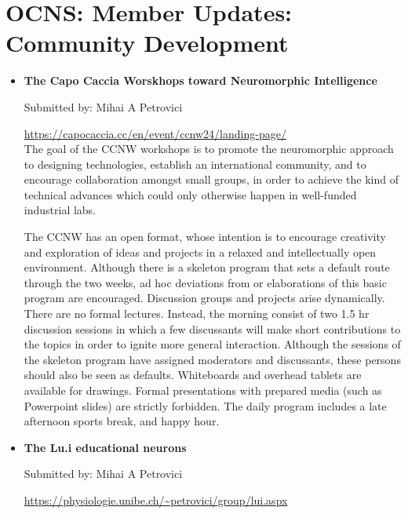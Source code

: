 \section*{OCNS: Member Updates: Community Development}%

\begin{itemize}[itemsep=3ex]
    \item \textbf{\large The Capo Caccia Worskhops toward Neuromorphic Intelligence}

        Submitted by: Mihai A Petrovici

        \url{https://capocaccia.cc/en/event/ccnw24/landing-page/}\\

        The goal of the CCNW workshops is to promote the neuromorphic approach to designing technologies, establish an international community, and to encourage collaboration amongst small groups, in order to achieve the kind of technical advances which could only otherwise happen in well-funded industrial labs.

        The CCNW has an open format, whose intention is to encourage creativity and exploration of ideas and projects in a relaxed and intellectually open environment. Although there is a skeleton program that sets a default route through the two weeks, ad hoc deviations from or elaborations of this basic program are encouraged. Discussion groups and projects arise dynamically. There are no formal lectures. Instead, the morning consist of two 1.5 hr discussion sessions in which a few discussants will make short contributions to the topics in order to ignite more general interaction. Although the sessions of the skeleton program have assigned moderators and discussants, these persons should also be seen as defaults. Whiteboards and overhead tablets are available for drawings. Formal presentations with prepared media (such as Powerpoint slides) are strictly forbidden. The daily program includes a late afternoon sports break, and happy hour.


    \item \textbf{\large The Lu.i educational neurons}

        Submitted by: Mihai A Petrovici

        \url{https://physiologie.unibe.ch/~petrovici/group/lui.aspx}\\


\end{itemize}
